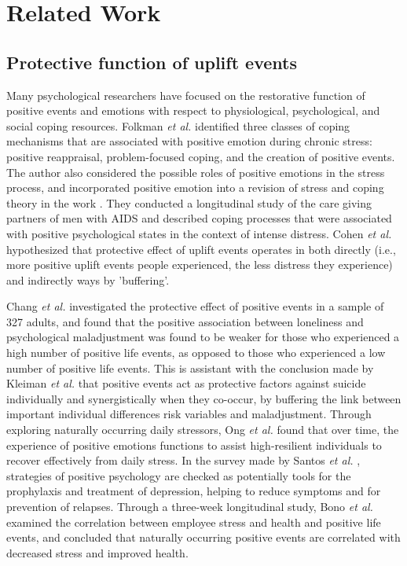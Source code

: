 \section{Related Work}
\label{sec:related}
\subsection{Protective function of uplift events}
Many psychological researchers have focused on the restorative function of positive events and emotions with respect to physiological, psychological, and social coping resources.
Folkman \emph{et al.}\cite{Folkman2010Stress} identified three classes of coping mechanisms that are associated with positive emotion during chronic stress: positive reappraisal, problem-focused coping, and the creation of positive events.
The author also considered the possible roles of positive emotions in the stress process, and incorporated positive emotion into a revision of stress and coping theory in
the work \cite{Folkman1997Positive}.
They conducted a longitudinal study of the care giving partners of men with AIDS and described coping processes that were associated with positive psychological states in the context of intense distress.
Cohen \emph{et al.} \cite{Cohen2010Positive} hypothesized that protective effect of uplift events operates in both directly (i.e., more positive uplift events people experienced, the less distress they experience) and indirectly ways by 'buffering'.

Chang \emph{et al.} \cite{Chang2015Loneliness} investigated the protective effect of positive events in a sample of 327 adults, and found that the positive association between loneliness and psychological maladjustment was found to be weaker for those who experienced a high number of positive life events, as opposed to those who experienced a low number of positive life events.
This is assistant with the conclusion made by Kleiman \emph{et al.}
\cite{Evan2014Social} that positive events act as protective factors against suicide individually and synergistically when they co-occur, by buffering the link between important individual differences risk variables and maladjustment.
Through exploring naturally occurring daily stressors, Ong \emph{et al.}
\cite{Ong2006Psychological} found that over time,
the experience of positive emotions functions to assist high-resilient individuals to recover effectively from daily stress.
In the survey made by Santos \emph{et al.} \cite{Santos2013The}, strategies of positive psychology are checked as potentially tools for the prophylaxis and treatment of depression, helping to reduce symptoms and for prevention of relapses.
Through a three-week longitudinal study, Bono \emph{et al.}
\cite{Bono2013Building} examined the correlation between employee stress and health and positive life events, and concluded that naturally occurring positive events are correlated with decreased stress and improved health.

